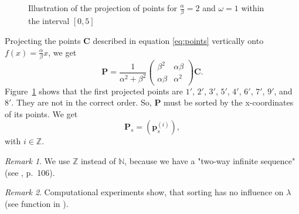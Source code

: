 \documentclass[11pt]{article}
\theoremstyle{remark}
\newtheorem{remark}{Remark}
\begin{document}
\begin{figure}[htbp]
    \centering
	\caption{Illustration of the projection of points for $\frac{\alpha}{\beta} = 2$ and $\omega = 1$ within the interval $[0, 5]$}
    \label{fig:a2o1}
\end{figure}
%
Projecting the points $\mathbf{C}$ described in equation \ref{eq:points} vertically onto $f(x) = \frac{\alpha}{\beta} x$, we get
%
\begin{equation}
\mathbf{P}
= \frac{1}{\alpha^2 + \beta^2} \begin{pmatrix} \beta^2 & \alpha \beta \\ \alpha \beta & \alpha^2 \end{pmatrix} \mathbf{C}.\label{eq:c}
\end{equation}
%
Figure~\ref{fig:a2o1} shows that the first projected points are $1'$, $2'$, $3'$, $5'$, $4'$, $6'$, $7'$, $9'$, and $8'$. They are not in the correct order. So, $\mathbf{P}$ must be sorted by the x-coordinates of its points. We get
\begin{equation}
\mathbf{P}_s = \left(\mathbf{p}_s^{(i)} \right),\label{eq:sort}
\end{equation}
with $i \in \mathbb{Z}$.
%
\begin{remark}
We use $\mathbb{Z}$ instead of $\mathbb{N}$, because we have a "two-way infinite sequence" (see \cite{Senechal2009}, p.~106).
\end{remark}
%
\begin{remark}
Computational experiments show, that sorting has no influence on $\lambda$ (see \langc function  in \cite{Kunert2025}).
\end{remark}
\end{document}
